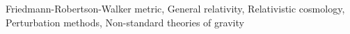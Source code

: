 \documentclass[twocolumn]{aastex631}
\begin{document}
Friedmann-Robertson-Walker metric, General relativity, Relativistic cosmology, Perturbation methods, Non-standard theories of gravity
\end{document}
